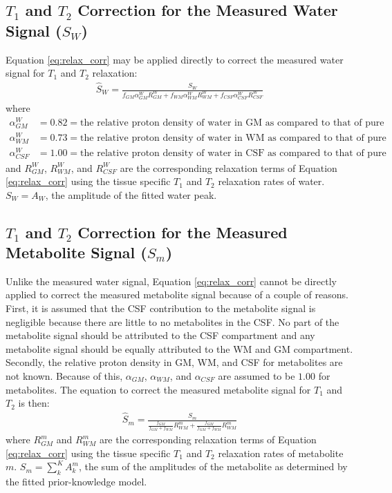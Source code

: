 \documentclass{article}
\begin{document}
\subsection{$T_1$ and $T_2$ Correction for the Measured Water Signal ($S_W$)}
Equation \eqref{eq:relax_corr} may be applied directly to correct the measured water signal for $T_1$ and $T_2$ relaxation:
\begin{align}
	\boxed{\hat{S}_W = \frac{S_W}{f_{GM} \alpha_{GM}^{W} R_{GM}^{W} + f_{WM} \alpha_{WM}^{W} R_{WM}^{W} + f_{CSF} \alpha_{CSF}^{W}  R_{CSF}^{W}}}
	\label{eq:relax_corr_water}
\end{align}
where
\begin{align*}
	\alpha_{GM}^{W} &= 0.82 = \text{the relative proton density of water in GM as compared to that of pure water} \\
	\alpha_{WM}^{W} &= 0.73 = \text{the relative proton density of water in WM as compared to that of pure water} \\
	\alpha_{CSF}^{W} &= 1.00 = \text{the relative proton density of water in CSF as compared to that of pure water}
\end{align*}
and $R_{GM}^{W}$, $R_{WM}^{W}$, and $R_{CSF}^{W}$ are the corresponding relaxation terms of Equation \eqref{eq:relax_corr} using the tissue specific $T_1$ and $T_2$ relaxation rates of water. $\boxed{S_W = A_W}$, the amplitude of the fitted water peak.

\subsection{$T_1$ and $T_2$ Correction for the Measured Metabolite Signal ($S_m$)}
Unlike the measured water signal, Equation \eqref{eq:relax_corr} cannot be directly applied to correct the measured metabolite signal because of a couple of reasons. First, it is assumed that the CSF contribution to the metabolite signal is negligible because there are little to no metabolites in the CSF. No part of the metabolite signal should be attributed to the CSF compartment and any metabolite signal should be equally attributed to the WM and GM compartment. Secondly, the relative proton density in GM, WM, and CSF for metabolites are not known. Because of this, $\alpha_{GM}$, $\alpha_{WM}$, and $\alpha_{CSF}$ are assumed to be $1.00$ for metabolites. The equation to correct the measured metabolite signal for $T_1$ and $T_2$ is then:
\begin{align}
	\boxed{\hat{S}_m = \frac{S_m}{\frac{f_{GM}}{f_{GM}+f_{WM}} R_{WM}^{m} + \frac{f_{GM}}{f_{GM}+f_{WM}}  R_{WM}^{m}}}
	\label{eq:relax_corr_metab}
\end{align}
where $R_{GM}^{m}$ and $R_{WM}^{m}$ are the corresponding relaxation terms of Equation \eqref{eq:relax_corr} using the tissue specific $T_1$ and $T_2$ relaxation rates of metabolite $m$. $\boxed{S_m = \sum_k^K A_k^m}$, the sum of the amplitudes of the metabolite as determined by the fitted prior-knowledge model.
\end{document}
